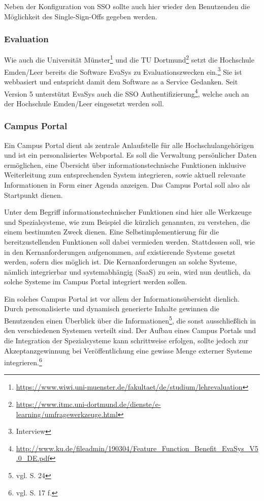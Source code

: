Neben der Konfiguration von SSO sollte auch hier wieder den Benutzenden die Möglichkeit des Single-Sign-Offs gegeben werden.

\subsubsection{Evaluation}
Wie auch die Universität Münster\footnote{\url{https://www.wiwi.uni-muenster.de/fakultaet/de/studium/lehrevaluation}} und die TU Dortmund\footnote{\url{https://www.itmc.uni-dortmund.de/dienste/e-learning/umfragewerkzeuge.html}} setzt die Hochschule Emden/Leer bereits die Software EvaSys zu Evaluationszwecken ein.\footnote{Interview} Sie ist webbasiert und entspricht damit dem Software as a Service Gedanken.
Seit Version 5 unterstützt EvaSys auch die SSO Authentifizierung\footnote{\url{http://www.ku.de/fileadmin/190304/Feature_Function_Benefit_EvaSys_V5.0_DE.pdf}}, welche auch an der Hochschule Emden/Leer eingesetzt werden soll.

\subsubsection{Campus Portal}
Ein Campus Portal dient als zentrale Anlaufstelle für alle Hochschulangehörigen und ist ein personalisiertes Webportal. Es soll die Verwaltung persönlicher Daten ermöglichen, eine Übersicht über informationstechnische Funktionen inklusive Weiterleitung zum entsprechenden System integrieren, sowie aktuell relevante Informationen in Form einer Agenda anzeigen. Das Campus Portal soll also als Startpunkt dienen.

Unter dem Begriff informationstechnischer Funktionen sind hier alle Werkzeuge und Spezialsysteme, wie zum Beispiel die kürzlich genannten, zu verstehen, die einem bestimmten Zweck dienen. Eine Selbstimplementierung für die bereitzustellenden Funktionen soll dabei vermieden werden. Stattdessen soll, wie in den Kernanforderungen aufgenommen, auf existierende Systeme gesetzt werden, sofern dies möglich ist. Die Kernanforderungen an solche Systeme, nämlich integrierbar und systemabhängig (SaaS) zu sein, wird nun deutlich, da solche Systeme im Campus Portal integriert werden sollen.

Ein solches Campus Portal ist vor allem der Informationsübersicht dienlich. Durch personalisierte und dynamisch generierte Inhalte gewinnen die Benutzenden einen Überblick über die Informationen\footnote{vgl. \cite{dini_webportale_2007} S. 24}, die sonst ausschließlich in den verschiedenen Systemen verteilt sind. Der Aufbau eines Campus Portals und die Integration der Spezialsysteme kann schrittweise erfolgen, sollte jedoch zur Akzeptanzgewinnung bei Veröffentlichung eine gewisse Menge externer Systeme integrieren.\footnote{vgl. \cite{dini_webportale_2007} S. 17 f.}

